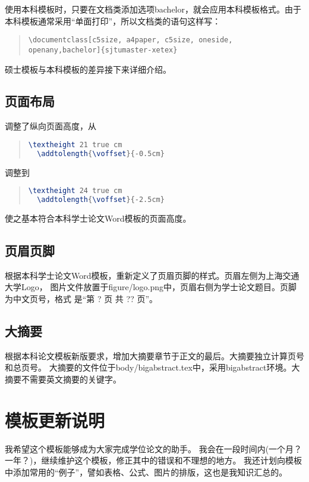 使用本科模板时，只要在文档类添加选项bachelor，就会应用本科模板格式。由于本科模板通常采用``单面打印''，所以文档类的语句这样写：

\begin{quote}
  {\scriptsize\verb+\documentclass[c5size, a4paper, c5size, oneside, openany,bachelor]{sjtumaster-xetex}+}
\end{quote}

硕士模板与本科模板的差异接下来详细介绍。

\subsection{页面布局}
\label{subsec:bachelor_pagelayout}
调整了纵向页面高度，从
\begin{quote}
  {
\begin{lstlisting}[language={TeX}]
  \textheight 21 true cm
  \addtolength{\voffset}{-0.5cm}
\end{lstlisting}
  }
\end{quote}
调整到
\begin{quote}
  {
\begin{lstlisting}[language={TeX}]
  \textheight 24 true cm
  \addtolength{\voffset}{-2.5cm}
\end{lstlisting}}
\end{quote}
使之基本符合本科学士论文Word模板的页面高度。

\subsection{页眉页脚}
\label{subsec:bachelor_fancyfnt}
根据本科学士论文Word模板，重新定义了页眉页脚的样式。页眉左侧为上海交通大学Logo，
图片文件放置于figure/logo.png中，页眉右侧为学士论文题目。页脚为中文页号，格式
是“第 ? 页 共 ?? 页”。

\subsection{大摘要}
\label{subsec:bigabstract}
根据本科论文模板新版要求，增加大摘要章节于正文的最后。大摘要独立计算页号和总页号。
大摘要的文件位于body/bigabstract.tex中，采用bigabstract环境。大摘要不需要英文摘要的关键字。

\section{模板更新说明}
\label{sec:update}

我希望这个模板能够成为大家完成学位论文的助手。
我会在一段时间内(一个月？一年？)，继续维护这个模板，修正其中的错误和不理想的地方。
我还计划向模板中添加常用的``例子''，譬如表格、公式、图片的排版，这也是我知识汇总的。

